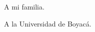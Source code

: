 
\thispagestyle{empty}
\vspace*{17mm}

\begin{flushright}
\begin{itshape}

A mi familia.\bigskip\bigskip

A la Universidad de Boyacá.\bigskip\bigskip


\end{itshape}
\end{flushright}

